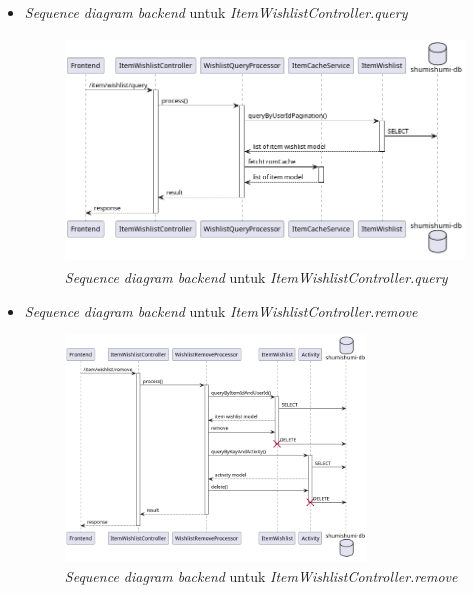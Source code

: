\documentclass[a4paper]{article}
\begin{document}
\begin{enumerate}
\begin{enumerate}
\begin{itemize}
            \newpage
            \item \textit{Sequence diagram backend} untuk \textit{ItemWishlistController.query}
            \begin{figure}[h]
                \centering
                \includegraphics*[height=6cm]{diagram/sequence diagram/BE/Item Wishlist Controller/query/query.png}
                \caption{\textit{Sequence diagram backend} untuk \textit{ItemWishlistController.query}}
            \end{figure}

            \item \textit{Sequence diagram backend} untuk \textit{ItemWishlistController.remove}
            \begin{figure}[h]
                \centering
                \includegraphics*[height=6cm]{diagram/sequence diagram/BE/Item Wishlist Controller/remove/remove.png}
                \caption{\textit{Sequence diagram backend} untuk \textit{ItemWishlistController.remove}}
            \end{figure}


\end{itemize}
\end{enumerate}
\end{enumerate}
\end{document}
